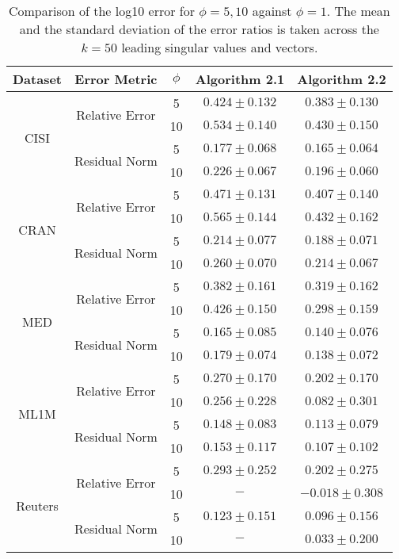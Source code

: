 \begin{table}[h]
    \centering
    \begin{tabular}{c|c|c|cc}
        \hline\hline
        Dataset & Error Metric & $\phi$ & Algorithm 2.1 & Algorithm 2.2 \\
        \hline
        \multirow{4}{*}{CISI} & \multirow{2}{*}{Relative Error} & 5 & $ 0.424 \pm 0.132 $ & $ 0.383 \pm 0.130 $ \\
         & & 10 & $ 0.534 \pm 0.140 $ & $ 0.430 \pm 0.150 $ \\
        \cline{2-5}
         & \multirow{2}{*}{Residual Norm} & 5 & $ 0.177 \pm 0.068 $ & $ 0.165 \pm 0.064 $ \\
         & & 10 & $ 0.226 \pm 0.067 $ & $ 0.196 \pm 0.060 $ \\
        \hline
        \multirow{4}{*}{CRAN} & \multirow{2}{*}{Relative Error} & 5 & $ 0.471 \pm 0.131 $ & $ 0.407 \pm 0.140 $ \\ 
         & & 10 & $ 0.565 \pm 0.144 $ & $ 0.432 \pm 0.162 $ \\
        \cline{2-5}
         & \multirow{2}{*}{Residual Norm} & 5 & $ 0.214 \pm 0.077 $ & $ 0.188 \pm 0.071 $ \\
         & & 10 & $ 0.260 \pm 0.070 $ & $ 0.214 \pm 0.067 $ \\
        \hline
        \multirow{4}{*}{MED} & \multirow{2}{*}{Relative Error} & 5 & $ 0.382 \pm 0.161 $ & $ 0.319 \pm 0.162 $ \\
         & & 10 & $ 0.426 \pm 0.150 $ & $ 0.298 \pm 0.159 $ \\ 
        \cline{2-5}
         & \multirow{2}{*}{Residual Norm} & 5 & $ 0.165 \pm 0.085 $ & $ 0.140 \pm 0.076 $ \\
         & & 10 & $ 0.179 \pm 0.074 $ & $ 0.138 \pm 0.072 $ \\
        \hline
        \multirow{4}{*}{ML1M} & \multirow{2}{*}{Relative Error} & 5 & $ 0.270 \pm 0.170 $ & $ 0.202 \pm 0.170 $ \\
         & & 10 & $ 0.256 \pm 0.228 $ & $ 0.082 \pm 0.301 $ \\
        \cline{2-5}
         & \multirow{2}{*}{Residual Norm} & 5 & $ 0.148 \pm 0.083 $ & $ 0.113 \pm 0.079 $ \\
         & & 10 & $ 0.153 \pm 0.117 $ & $ 0.107 \pm 0.102 $ \\
        \hline
        \multirow{4}{*}{Reuters} & \multirow{2}{*}{Relative Error} & 5 & $ 0.293 \pm 0.252 $ & $ 0.202 \pm 0.275 $ \\
         & & 10 & $-$ & $ -0.018 \pm 0.308 $ \\
        \cline{2-5}
         & \multirow{2}{*}{Residual Norm} & 5 & $ 0.123 \pm 0.151 $ & $ 0.096 \pm 0.156 $ \\
         & & 10 & $-$ & $ 0.033 \pm 0.200 $ \\
        \hline\hline
    \end{tabular}
    \caption{Comparison of the log10 error for $\phi = 5, 10$ against $\phi = 1$. The mean and the standard deviation of the error ratios is taken across the $k=50$ leading singular values and vectors.}
    \label{table:error_comparison}
\end{table}